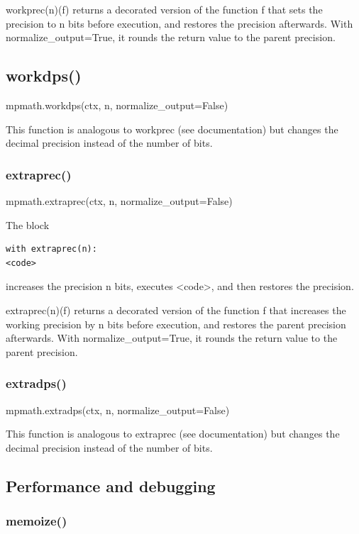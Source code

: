 \vpara
workprec(n)(f) returns a decorated version of the function f that sets the precision to n bits before execution, and restores the precision afterwards. With normalize\_output=True, it rounds the return value to the parent precision.

\subsection{workdps()}

mpmath.workdps(ctx, n, normalize\_output=False)

\vpara
This function is analogous to workprec (see documentation) but changes the decimal precision instead of the number of bits.


\subsubsection{extraprec()}

mpmath.extraprec(ctx, n, normalize\_output=False)

The block
\begin{lstlisting}
with extraprec(n):
<code>
\end{lstlisting}
increases the precision n bits, executes <code>, and then restores the precision.

\vpara
extraprec(n)(f) returns a decorated version of the function f that increases the working precision by n bits before execution, and restores the parent precision afterwards. With normalize\_output=True, it rounds the return value to the parent precision.

\subsubsection{extradps()}

mpmath.extradps(ctx, n, normalize\_output=False)

This function is analogous to extraprec (see documentation) but changes the decimal precision instead of the number of bits.

\subsection{Performance and debugging}

\subsubsection{memoize()}

